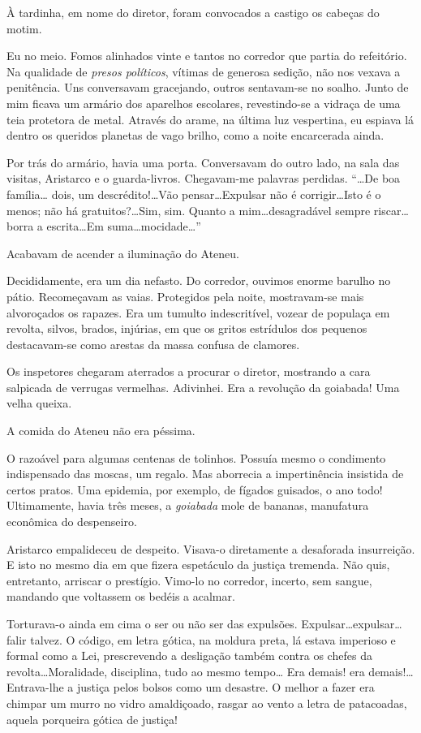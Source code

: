 À tardinha, em nome do diretor, foram convocados a castigo os
cabeças do motim. 

Eu no meio. Fomos alinhados vinte e tantos no
corredor que partia do refeitório. Na qualidade de \textit{presos políticos},
vítimas de generosa sedição, não nos vexava a penitência. Uns
conversavam gracejando, outros sentavam{}-se no soalho. Junto de mim
ficava um armário dos aparelhos escolares, revestindo{}-se a vidraça de
uma teia protetora de metal. Através do arame, na última luz
vespertina, eu espiava lá dentro os queridos planetas de vago brilho,
como a noite encarcerada ainda. 

Por trás do armário, havia uma porta.
Conversavam do outro lado, na sala das visitas, Aristarco e o
guarda{}-livros. Chegavam{}-me palavras perdidas. ``\ldots De boa família\ldots
dois, um descrédito!\ldots Vão pensar\ldots Expulsar não é corrigir\ldots Isto é
o menos; não há gratuitos?\ldots Sim, sim. Quanto a mim\ldots desagradável
sempre riscar\ldots borra a escrita\ldots Em suma\ldots mocidade\ldots'' 

Acabavam de acender a iluminação do Ateneu. 

Decididamente, era um dia nefasto. Do corredor, ouvimos enorme barulho no pátio. 
Recomeçavam as vaias. Protegidos pela noite, mostravam{}-se mais alvoroçados 
os rapazes. Era um tumulto indescritível, vozear de populaça em revolta, silvos,
brados, injúrias, em que os gritos estrídulos dos pequenos
destacavam{}-se como arestas da massa confusa de clamores. 

Os inspetores chegaram aterrados a procurar o diretor, mostrando a cara
salpicada de verrugas vermelhas. Adivinhei. Era a revolução da
goiabada! Uma velha queixa. 

A comida do Ateneu não era péssima. 

O razoável para algumas centenas de tolinhos. Possuía mesmo o condimento
indispensado das moscas, um regalo. Mas aborrecia a impertinência
insistida de certos pratos. Uma epidemia, por exemplo, de fígados
guisados, o ano todo! Ultimamente, havia três meses, a \textit{goiabada} mole de
bananas, manufatura econômica do despenseiro. 

Aristarco empalideceu de despeito. Visava{}-o diretamente a desaforada insurreição. 
E isto no mesmo dia em que fizera espetáculo da justiça tremenda. Não quis,
entretanto, arriscar o prestígio. Vimo{}-lo no corredor, incerto, sem
sangue, mandando que voltassem os bedéis a acalmar. 

Torturava{}-o ainda
em cima o ser ou não ser das expulsões. Expulsar\ldots expulsar\ldots falir
talvez. O código, em letra gótica, na moldura preta, lá estava
imperioso e formal como a Lei, prescrevendo a desligação também contra
os chefes da revolta\ldots Moralidade, disciplina, tudo ao mesmo tempo\ldots
Era demais! era demais!\ldots Entrava{}-lhe a justiça pelos bolsos como um
desastre. O melhor a fazer era chimpar um murro no vidro amaldiçoado,
rasgar ao vento a letra de patacoadas, aquela porqueira gótica de justiça! 

